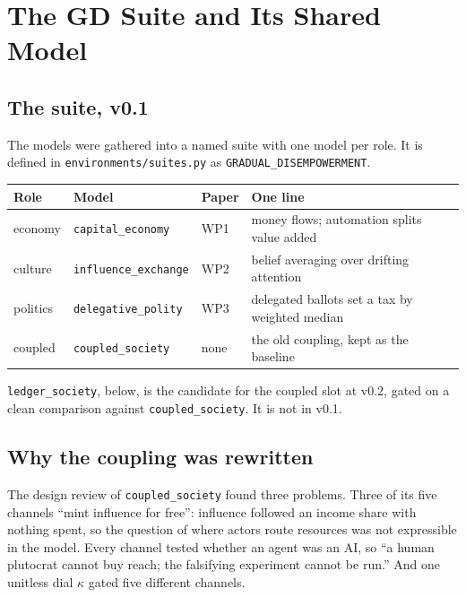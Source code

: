 \documentclass[11pt]{article}
\newcommand{\code}[1]{\texttt{#1}}
\begin{document}
\section{The GD Suite and Its Shared Model}

\subsection{The suite, v0.1}

{\sloppy The models were gathered into a named suite with one model per role. It is
defined in \code{environments/suites.py} as \code{GRADUAL\_DISEMPOWERMENT}.\par}

\begin{center}
\begin{tabular}{@{}llll@{}}
\toprule
\textbf{Role} & \textbf{Model} & \textbf{Paper} & \textbf{One line} \\
\midrule
economy  & \code{capital\_economy}    & WP1 & money flows; automation splits value added \\
culture  & \code{influence\_exchange} & WP2 & belief averaging over drifting attention \\
politics & \code{delegative\_polity}  & WP3 & delegated ballots set a tax by weighted median \\
coupled  & \code{coupled\_society}    & none & the old coupling, kept as the baseline \\
\bottomrule
\end{tabular}
\end{center}

\noindent \code{ledger\_society}, below, is the candidate for the coupled slot at v0.2,
gated on a clean comparison against \code{coupled\_society}. It is not in v0.1.

\subsection{Why the coupling was rewritten}

The design review of \code{coupled\_society} found three problems. Three of its five
channels ``mint influence for free'': influence followed an income share with nothing
spent, so the question of where actors route resources was not expressible in the
model. Every channel tested whether an agent was an AI, so ``a human plutocrat cannot
buy reach; the falsifying experiment cannot be run.'' And one unitless dial $\kappa$
gated five different channels.
\end{document}
